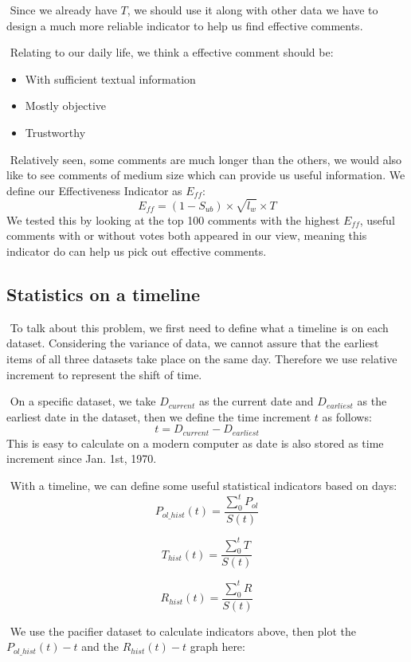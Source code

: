 \documentclass[12pt]{article}  %
\begin{document}
​		Since we already have $T$, we should use it along with other data we have to design a much more reliable indicator to help us find effective comments.

​		Relating to our daily life, we think a effective comment should be:
\begin{itemize}
\item With sufficient textual information
\item Mostly objective
  \item  Trustworthy
\end{itemize}

​		Relatively seen, some comments are much longer than the others, we would also like to see comments of medium size which can provide us useful information. We define our Effectiveness Indicator as $E_{ff}$:
$$
E_{ff}=(1-S_{ub}) \times \sqrt{l_{w}}\times T
$$
​		We tested this by looking at the top 100 comments with the highest $E_{ff}$, useful comments with or without votes both appeared in our view, meaning this indicator do can help us pick out effective comments.



\subsection{Statistics on a timeline}

​		To talk about this problem, we first need to define what a timeline is on each dataset. Considering the variance of data, we cannot assure that the earliest items of all three datasets take place on the same day. Therefore we use relative increment to represent the shift of time.

​		On a specific dataset, we take $D_{current}$ as the current date and $D_{earliest}$ as the earliest date in the dataset, then we define the time increment $t$ as follows:
$$
t = D_{current} - D_{earliest}
$$
​		This is easy to calculate on a modern computer as date is also stored as time increment since Jan. 1st, 1970.

​		With a timeline, we can define some useful statistical indicators based on days:
$$
P_{ol\_hist}(t) = \frac{\sum_{0}^{t} P_{ol}}{S(t)}
$$

$$
T_{hist}(t) = \frac{\sum_{0}^{t} T}{S(t)}
$$

$$
R_{hist}(t) = \frac{\sum_{0}^{t} R}{S(t)}
$$

​		We use the pacifier dataset to calculate indicators above, then plot the $P_{ol\_hist}(t)-t$ and the $R_{hist}(t)-t$ graph here:
\end{document}
